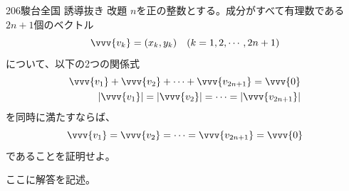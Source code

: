 \begin{prob}{206}{}{駿台全国 誘導抜き 改題}
 $n$を正の整数とする。成分がすべて有理数である$2n+1$個のベクトル
 \[ \vvv{v_k}=(x_k,y_k) \quad (k=1, 2, \cdots, 2n+1) \]
 について、以下の2つの関係式
 \begin{align*}
  \vvv{v_1}+\vvv{v_2}+\cdots+\vvv{v_{2n+1}}=\vvv{0} \\
  |\vvv{v_1}|=|\vvv{v_2}|=\cdots=|\vvv{v_{2n+1}}|
 \end{align*}
 を同時に満たすならば、
 \[ \vvv{v_1}=\vvv{v_2}=\cdots=\vvv{v_{2n+1}}=\vvv{0} \]
 であることを証明せよ。
\end{prob}
ここに解答を記述。